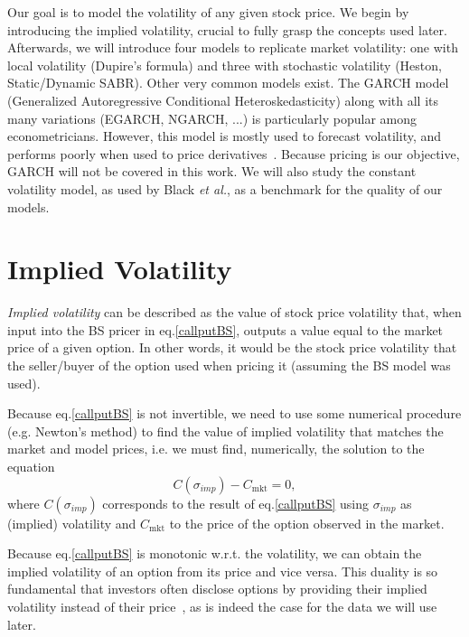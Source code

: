 Our goal is to model the volatility of any given stock price.
We begin by introducing the implied volatility, crucial to fully grasp the concepts used later. Afterwards, we will introduce four models to replicate market volatility: one with local volatility (Dupire's formula) and three with stochastic volatility (Heston, Static/Dynamic SABR).
Other very common models exist. The GARCH model (Generalized Autoregressive Conditional Heteroskedasticity) along with all its many variations (EGARCH, NGARCH, ...) is particularly popular among econometricians. However, this model is mostly used to forecast volatility, and performs poorly when used to price derivatives~\cite{chourdakis}. Because pricing is our objective, GARCH will not be covered in this work. We will also study the constant volatility model, as used by Black \textit{et al.}, as a benchmark for the quality of our models.



\section{Implied Volatility}
\label{section:impliedvolatility}
\emph{Implied volatility} can be described as the value of stock price volatility that, when input into the BS pricer in eq.\eqref{callputBS}, outputs a value equal to the market price of a given option.
In other words, it would be the stock price volatility that the seller/buyer of the option used when pricing it (assuming the BS model was used).

Because eq.\eqref{callputBS} is not invertible, we need to use some numerical procedure (e.g. Newton's method) to find the value of implied volatility that matches the market and model prices, i.e. we must find, numerically, the solution to the equation
\begin{equation}\label{impvolform}
C(\sigma_{imp})-C_{\mathrm{mkt}}=0,
\end{equation}
\noindent where $C(\sigma_{imp})$ corresponds to the result of eq.\eqref{callputBS} using $\sigma_{imp}$ as (implied) volatility and $C_{\mathrm{mkt}}$ to the price of the option observed in the market.

Because eq.\eqref{callputBS} is monotonic w.r.t. the volatility, we can obtain the implied volatility of an option from its price and vice versa. This duality is so fundamental that investors often disclose options by providing their implied volatility instead of their price~\cite{Wilmott}, as is indeed the case for the data we will use later.

